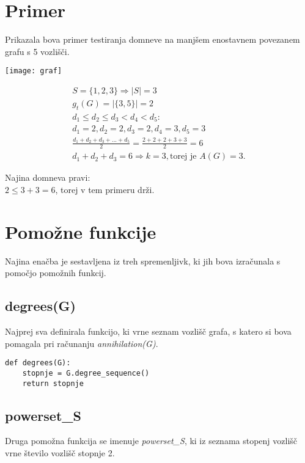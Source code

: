 \documentclass[11pt, a4paper]{article}
\begin{document}
\section{\textbf{Primer}}

Prikazala bova primer testiranja domneve na manjšem enostavnem povezanem grafu s 5 vozlišči.

\vspace{0,5cm}
\begin{center}
\texttt{[image: graf]}

\vspace{0,5cm}
\begin{gather*}
S = \{1, 2, 3\} \Rightarrow |S| = 3 \\
g_t(G) = |\{3, 5\}| = 2 \\
d_1 \leq d_2 \leq d_3 < d_4 < d_5: \\
d_1 = 2, d_2 = 2, d_3 = 2, d_4 = 3, d_5 = 3 \\
\frac{d_1 + d_2 + d_3 + ... + d_5}{2} = \frac{2+2+2+3+3}{2} = 6 \\
d_1 + d_2 + d_3 = 6 \Rightarrow k = 3, \text{torej je } A(G) = 3. 
\end{gather*}

\vspace{0.5cm}
Najina domneva pravi: \\
\vspace{0.5cm}
$2 \leq 3 + 3 = 6$, torej v tem primeru drži. \\
\end{center}

\section{\textbf{Pomožne funkcije}}
Najina enačba je sestavljena iz treh spremenljivk, ki jih bova izračunala s pomočjo pomožnih funkcij. 

\subsection{\textbf{degrees(G)}}
Najprej sva definirala funkcijo, ki vrne seznam vozlišč grafa, s katero si bova pomagala pri računanju \textit{annihilation(G)}.

\begin{verbatim}
def degrees(G):
    stopnje = G.degree_sequence()
    return stopnje
\end{verbatim}

\subsection{\textbf{powerset\_S}}
Druga pomožna funkcija se imenuje \textit{powerset\_S}, ki iz seznama stopenj vozlišč vrne število vozlišč stopnje 2.
\end{document}
